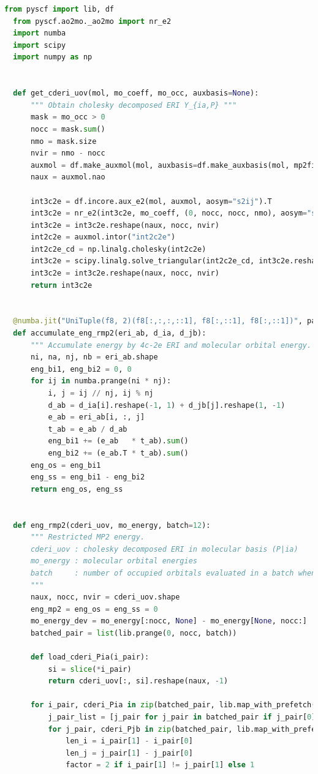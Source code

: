 \begin{lstlisting}[language=Python]
  from pyscf import lib, df
  from pyscf.ao2mo._ao2mo import nr_e2
  import numba
  import scipy
  import numpy as np
  
  
  def get_cderi_uov(mol, mo_coeff, mo_occ, auxbasis=None):
      """ Obtain cholesky decomposed ERI Y_{ia,P} """
      mask = mo_occ > 0
      nocc = mask.sum()
      nmo = mask.size
      nvir = nmo - nocc
      auxmol = df.make_auxmol(mol, auxbasis=df.make_auxbasis(mol, mp2fit=True)).build()
      naux = auxmol.nao
      
      int3c2e = df.incore.aux_e2(mol, auxmol, aosym="s2ij").T
      int3c2e = nr_e2(int3c2e, mo_coeff, (0, nocc, nocc, nmo), aosym="s2", mosym="s1")
      int3c2e = int3c2e.reshape(naux, nocc, nvir)
      int2c2e = auxmol.intor("int2c2e")
      int2c2e_cd = np.linalg.cholesky(int2c2e)
      int3c2e = scipy.linalg.solve_triangular(int2c2e_cd, int3c2e.reshape(naux, -1), lower=True)
      int3c2e = int3c2e.reshape(naux, nocc, nvir)
      return int3c2e
  
  
  @numba.jit("UniTuple(f8, 2)(f8[:,:,:,::1], f8[:,::1], f8[:,::1])", parallel=True, nopython=True)
  def accumulate_eng_rmp2(eri_ab, d_ia, d_jb):
      """ Accumulate energy by 4c-2e ERI and molecular orbital energy. """
      ni, na, nj, nb = eri_ab.shape
      eng_bi1, eng_bi2 = 0, 0
      for ij in numba.prange(ni * nj):
          i, j = ij // nj, ij % nj
          d_ab = d_ia[i].reshape(-1, 1) + d_jb[j].reshape(1, -1)
          e_ab = eri_ab[i, :, j]
          t_ab = e_ab / d_ab
          eng_bi1 += (e_ab   * t_ab).sum()
          eng_bi2 += (e_ab.T * t_ab).sum()
      eng_os = eng_bi1
      eng_ss = eng_bi1 - eng_bi2
      return eng_os, eng_ss
  
  
  def eng_rmp2(cderi_uov, mo_energy, batch=12):
      """ Restricted MP2 energy.
      cderi_uov : cholesky decomposed ERI in molecular basis (P|ia)
      mo_energy : molecular orbital energies
      batch     : number of occupied orbitals evaluated in a batch when energy accumulation
      """
      naux, nocc, nvir = cderi_uov.shape
      eng_mp2 = eng_os = eng_ss = 0
      mo_energy_dev = mo_energy[:nocc, None] - mo_energy[None, nocc:]
      batched_pair = list(lib.prange(0, nocc, batch))
      
      def load_cderi_Pia(i_pair):
          si = slice(*i_pair)
          return cderi_uov[:, si].reshape(naux, -1)
  
      for i_pair, cderi_Pia in zip(batched_pair, lib.map_with_prefetch(load_cderi_Pia, batched_pair)):
          j_pair_list = [j_pair for j_pair in batched_pair if j_pair[0] <= i_pair[0]]
          for j_pair, cderi_Pjb in zip(batched_pair, lib.map_with_prefetch(load_cderi_Pia, j_pair_list)):
              len_i = i_pair[1] - i_pair[0]
              len_j = j_pair[1] - j_pair[0]
              factor = 2 if i_pair[1] != j_pair[1] else 1
  

\end{lstlisting}
